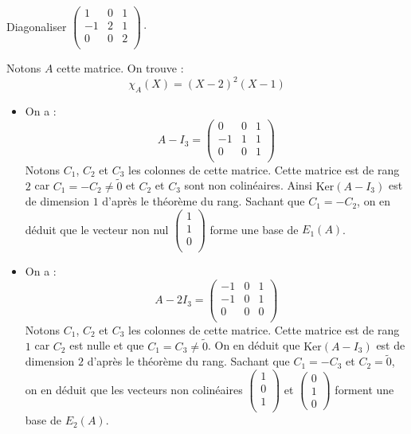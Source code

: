 \documentclass[a4paper,10pt]{report}
\begin{document}
\begin{Exercice}{} Diagonaliser $\begin{pmatrix}
1 & 0& 1 \\
-1 & 2 & 1 \\
0 & 0 & 2 \\
\end{pmatrix}\cdot$
\end{Exercice}

\corr Notons $A$ cette matrice. On trouve :
$$ \chi_A(X) = (X-2)^2(X-1)$$
\begin{itemize}
\item On a : 
$$ A- I_3 = \begin{pmatrix}
0 & 0& 1 \\
-1 & 1 & 1 \\
0 & 0 & 1 \\
\end{pmatrix}$$
Notons $C_1$, $C_2$ et $C_3$ les colonnes de cette matrice. Cette matrice est de rang $2$ car $C_1=-C_2 \neq \tilde{0}$ et $C_2$ et $C_3$ sont non colinéaires. Ainsi $\textrm{Ker}(A-I_3)$ est de dimension $1$ d'après le théorème du rang. Sachant que $C_1=-C_2$, on en déduit que le vecteur non nul $\begin{pmatrix}
1 \\
1 \\
0 \\
\end{pmatrix}$ forme une base de $E_1(A)$.
\item On a : 
$$ A- 2I_3 = \begin{pmatrix}
-1 & 0& 1 \\
-1 & 0 & 1 \\
0 & 0 & 0 \\
\end{pmatrix}$$
Notons $C_1$, $C_2$ et $C_3$ les colonnes de cette matrice. Cette matrice est de rang $1$ car $C_2$ est nulle et que $C_1=C_3 \neq \tilde{0}$. On en déduit que $\textrm{Ker}(A-I_3)$ est de dimension $2$ d'après le théorème du rang. Sachant que $C_1=-C_3$ et $C_2= \tilde{0}$, on en déduit que les vecteurs non colinéaires $\begin{pmatrix}
1 \\
0 \\
1 \\
\end{pmatrix}$ et $\begin{pmatrix}
0 \\
1 \\
0
\end{pmatrix}$ forment une base de $E_2(A)$. 
\end{itemize}
\end{document}
